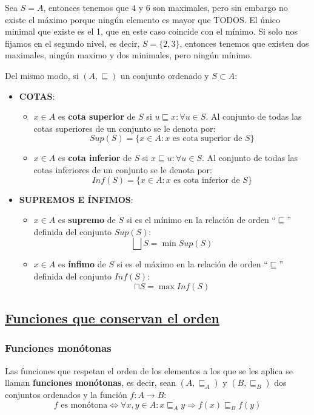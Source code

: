 \documentclass[10pt,a4paper,openright]{book}
\begin{document}
Sea $S=A$, entonces tenemos que $4$ y $6$ son maximales, pero sin embargo no existe el máximo porque ningún elemento es mayor que TODOS. El único minimal que existe es el 1, que en este caso coincide con el mínimo. Si solo nos fijamos en el segundo nivel, es decir, $S=\{2,3\}$, entonces tenemos que existen dos maximales, ningún maximo y dos minimales, pero ningún mínimo.

Del mismo modo, si $(A,\sqsubseteq)$ un conjunto ordenado y  $S\subset A$:
\begin{itemize}
\item \textbf{COTAS}:
	\begin{itemize}
	\item $x\in A$ es \textbf{cota superior} de $S$ si $u\sqsubseteq x: \forall u\in S$.
Al conjunto de todas las cotas superiores de un conjunto se le denota por:
$$Sup(S)=\{x\in A: x\mbox{ es cota superior de }S\}$$

	\item $x\in A$ es \textbf{cota inferior} de $S$ si $x\sqsubseteq u: \forall u\in S$.
Al conjunto de todas las cotas inferiores de un conjunto se le denota por:
$$Inf(S)=\{x\in A: x\mbox{ es cota inferior de }S\}$$
\end{itemize}

\item \textbf{SUPREMOS E ÍNFIMOS}:
	\begin{itemize}
	\item $x\in A$ es \textbf{supremo} de $S$ si es el mínimo en la relación de orden ``$\sqsubseteq$'' definida del conjunto $Sup(S)$:
	$$\bigsqcup S=\min Sup(S)$$

\item $x\in A$ es \textbf{ínfimo} de $S$ si es el máximo en la relación de orden ``$\sqsubseteq$'' definida del conjunto $Inf(S)$:
	$$\sqcap S=\max Inf(S)$$
\end{itemize}
\end{itemize}

\subsection*{\underline{Funciones que conservan el orden}}
\subsubsection*{Funciones monótonas}
Las funciones que respetan el orden de los elementos a los que se les aplica se llaman \textbf{funciones monótonas}, es decir, sean $(A,\sqsubseteq_A)$ y $(B,\sqsubseteq_B)$ dos conjuntos ordenados y la función $f: A\rightarrow B$:
$$f\mbox{ es monótona} \Leftrightarrow \forall x,y\in A: x\sqsubseteq_A y \Rightarrow f(x)\sqsubseteq_B f(y)$$
\end{document}
